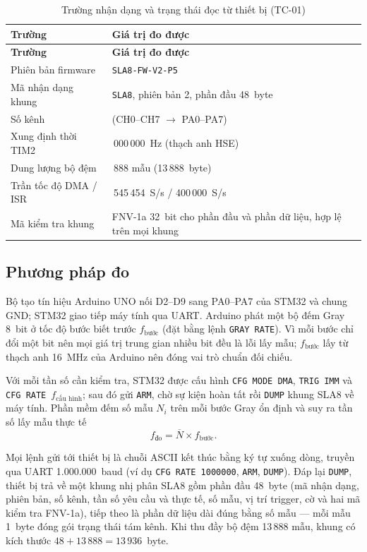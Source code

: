 \begin{longtable}[]{@{}|
  >{\raggedright\arraybackslash}p{}
  |>{\raggedright\arraybackslash}p{}|@{}}
\caption{Trường nhận dạng và trạng thái đọc từ thiết bị (TC-01)}\label{tab:identity}\tabularnewline
\hline
\textbf{Trường} & \textbf{Giá trị đo được} \\ \hline
\endfirsthead
\hline
\textbf{Trường} & \textbf{Giá trị đo được} \\ \hline
\endhead
\endlastfoot
Phiên bản firmware & \texttt{SLA8-FW-V2-P5} \\ \hline
Mã nhận dạng khung & \texttt{SLA8}, phiên bản 2, phần đầu 48~byte \\ \hline
Số kênh & 8 (CH0--CH7 $\to$ PA0--PA7) \\ \hline
Xung định thời TIM2 & 72\,000\,000~Hz (thạch anh HSE) \\ \hline
Dung lượng bộ đệm & 13\,888 mẫu (13\,888~byte) \\ \hline
Trần tốc độ DMA / ISR & 6\,545\,454~S/s / 400\,000~S/s \\ \hline
Mã kiểm tra khung & FNV-1a 32~bit cho phần đầu và phần dữ liệu, hợp lệ trên mọi khung \\ \hline
\end{longtable}

\subsection{Phương pháp đo}\label{sec:method}

Bộ tạo tín hiệu Arduino UNO nối D2--D9 sang PA0--PA7 của STM32 và chung GND; STM32 giao tiếp máy tính qua UART. Arduino phát một bộ đếm Gray 8~bit ở tốc độ bước biết trước \(f_{\text{bước}}\) (đặt bằng lệnh \texttt{GRAY RATE}). Vì mỗi bước chỉ đổi một bit nên mọi giá trị trung gian nhiều bit đều là lỗi lấy mẫu; \(f_{\text{bước}}\) lấy từ thạch anh 16~MHz của Arduino nên đóng vai trò chuẩn đối chiếu.

Với mỗi tần số cần kiểm tra, STM32 được cấu hình \texttt{CFG MODE DMA}, \texttt{TRIG IMM} và \texttt{CFG RATE}~\(f_{\text{cấu hình}}\); sau đó gửi \texttt{ARM}, chờ sự kiện hoàn tất rồi \texttt{DUMP} khung SLA8 về máy tính. Phần mềm đếm số mẫu \(N_i\) trên mỗi bước Gray ổn định và suy ra tần số lấy mẫu thực tế
\[ f_{\text{đo}} = \overline{N}\times f_{\text{bước}}. \]

Mọi lệnh gửi tới thiết bị là chuỗi ASCII kết thúc bằng ký tự xuống dòng, truyền qua UART 1.000.000~baud (ví dụ \texttt{CFG RATE 1000000}, \texttt{ARM}, \texttt{DUMP}). Đáp lại \texttt{DUMP}, thiết bị trả về một khung nhị phân SLA8 gồm phần đầu 48~byte (mã nhận dạng, phiên bản, số kênh, tần số yêu cầu và thực tế, số mẫu, vị trí trigger, cờ và hai mã kiểm tra FNV-1a), tiếp theo là phần dữ liệu dài đúng bằng số mẫu --- mỗi mẫu 1~byte đóng gói trạng thái tám kênh. Khi thu đầy bộ đệm 13\,888 mẫu, khung có kích thước \(48+13\,888 = 13\,936\)~byte.


